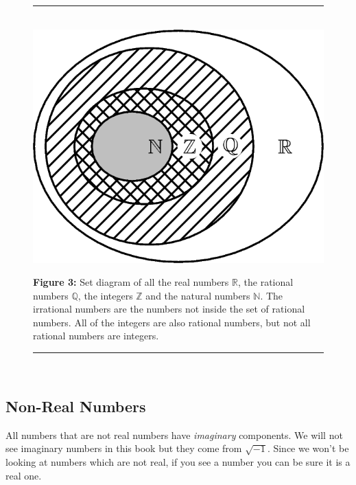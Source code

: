 	\begin{figure}[H] %
    \begin{center}
    \rule[.1in]{\figurerulewidth}{.005in} \\
        \label{m38346*uid53!!!underscore!!!media}\label{m38346*uid53!!!underscore!!!printimage}\includegraphics{col11306.imgs/m38346_MG10C2_003.png} %
      \vspace{2pt}
    \vspace{\rubberspace}\par \begin{cnxcaption}
	  \small \textbf{Figure 3: }Set diagram of all the real numbers $\mathbb{R}$, the rational
numbers $\mathbb{Q}$, the integers $\mathbb{Z}$ and the natural numbers $\mathbb{N}$. The irrational numbers are the numbers not inside the set of rational
numbers. All of the integers are also rational numbers, but not all rational
numbers are integers.
	\end{cnxcaption}
    \vspace{.1in}
    \rule[.1in]{\figurerulewidth}{.005in} \\
    \end{center}
 \end{figure}       
\label{m38346*secfhsst!!!underscore!!!id2036}
            \subsection{  Non-Real Numbers }
            \nopagebreak
      \label{m38346*id178383}All numbers that are not real numbers have
\textsl{imaginary} components. We will not see imaginary numbers in this book
but they come from $\sqrt{-1}$. Since we won't be looking at
numbers which are not real, if you see a number you can be sure it is a real
one. \par 
      \label{m38346*uid54}
